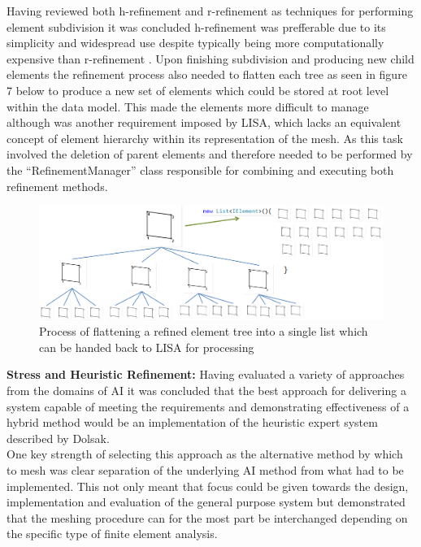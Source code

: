 \noindent
Having reviewed both h-refinement \cite{HandPRefinements} and r-refinement \cite{RRefinement} as techniques for performing element subdivision it was concluded h-refinement was prefferable due to its simplicity and widespread use despite typically being more computationally expensive than r-refinement \cite{HandPRefinements} \cite{RRefinement}. 
Upon finishing subdivision and producing new child elements the refinement process also needed to flatten each tree as seen in figure 7 below to produce a new set of elements which could be stored at root level within the data model. This made the elements more difficult to manage although was another requirement imposed by LISA, which lacks an equivalent concept of element hierarchy within its representation of the mesh. As this task involved the deletion of parent elements and therefore needed to be performed by the ``RefinementManager'' class responsible for combining and executing both refinement methods. \\

\begin{figure}[!h]
  \centerline{\includegraphics[width=150mm, scale=1]{../Graphics/ElemFlattening.png}}
  \caption{Process of flattening a refined element tree into a single list which can be handed back to LISA for processing}
  \label{fig:h-refinementImp}
\end{figure}

\noindent
\textbf{Stress and Heuristic Refinement: } Having evaluated a variety of approaches from the domains of AI it was concluded that the best approach for delivering a system capable of meeting the requirements and demonstrating effectiveness of a hybrid method would be an implementation of the heuristic expert system described by Dolsak. \\ 

\noindent
One key strength of selecting this approach as the alternative method by which to mesh was clear separation of the underlying AI method from what had to be implemented. This not only meant that focus could be given towards the design, implementation and evaluation of the general purpose system but demonstrated that the meshing procedure can for the most part be interchanged depending on the specific type of finite element analysis. \\ 


